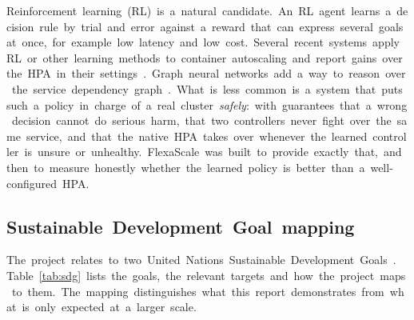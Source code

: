 \documentclass[12pt,a4paper,oneside]{report}
\begin{document}
Reinforcement~learning~(RL)~is~a~natural~candidate.~An~RL~agent~learns~a~decision~rule~by~trial~and~error~against~a~reward~that~can~express~several~goals~at~once,~for~example~low~latency~and~low~cost.~Several~recent~systems~apply~RL~or~other~learning~methods~to~container~autoscaling~and~report~gains~over~the~HPA~in~their~settings~\cite{gwydion,firm,rossi}.~Graph~neural~networks~add~a~way~to~reason~over~the~service~dependency~graph~\cite{graf,gcn}.~What~is~less~common~is~a~system~that~puts~such~a~policy~in~charge~of~a~real~cluster~\textit{safely}:~with~guarantees~that~a~wrong~decision~cannot~do~serious~harm,~that~two~controllers~never~fight~over~the~same~service,~and~that~the~native~HPA~takes~over~whenever~the~learned~controller~is~unsure~or~unhealthy.~FlexaScale~was~built~to~provide~exactly~that,~and~then~to~measure~honestly~whether~the~learned~policy~is~better~than~a~well-configured~HPA.


\subsection{Sustainable~Development~Goal~mapping}

The~project~relates~to~two~United~Nations~Sustainable~Development~Goals~\cite{un2030}.~Table~\ref{tab:sdg}~lists~the~goals,~the~relevant~targets~and~how~the~project~maps~to~them.~The~mapping~distinguishes~what~this~report~demonstrates~from~what~is~only~expected~at~a~larger~scale.
\end{document}
